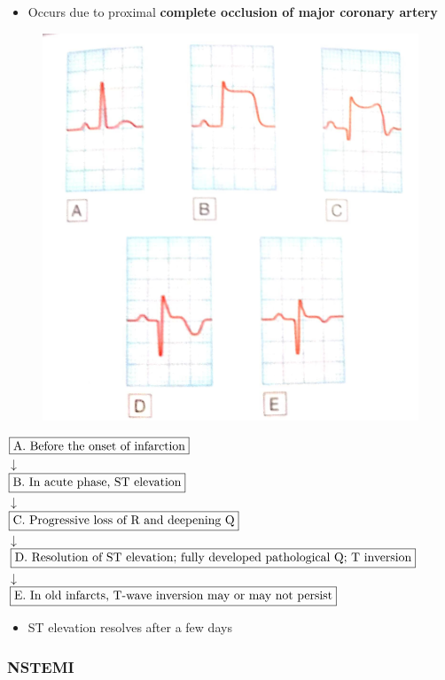 \documentclass[
  12pt,
]{memoir}
\providecommand{\tightlist}{%
  \setlength{\itemsep}{0pt}\setlength{\parskip}{0pt}}
\begin{document}
\begin{itemize}
\tightlist
\item
  Occurs due to proximal \textbf{complete occlusion of major coronary
  artery}
\end{itemize}

\begin{figure}
\centering
\includegraphics[width=.5\textwidth]{../assets/med/STEMI.jpg}
\end{figure}

\begin{center}
$\fbox{A. Before the onset of infarction}$\\
$\downarrow$\\
$\fbox{B. In acute phase, ST elevation}$\\
$\downarrow$\\
$\fbox{C. Progressive loss of R and deepening Q}$\\
$\downarrow$\\
$\fbox{D. Resolution of ST elevation; fully developed pathological Q;
T inversion}$\\
$\downarrow$\\
$\fbox{E. In old infarcts, T-wave inversion may or may not persist}$\\
\end{center}

\begin{itemize}
\tightlist
\item
  ST elevation resolves after a few days
\end{itemize}

\pagebreak

\hypertarget{nstemi}{%
\subsubsection{NSTEMI}\label{nstemi}}
\end{document}
